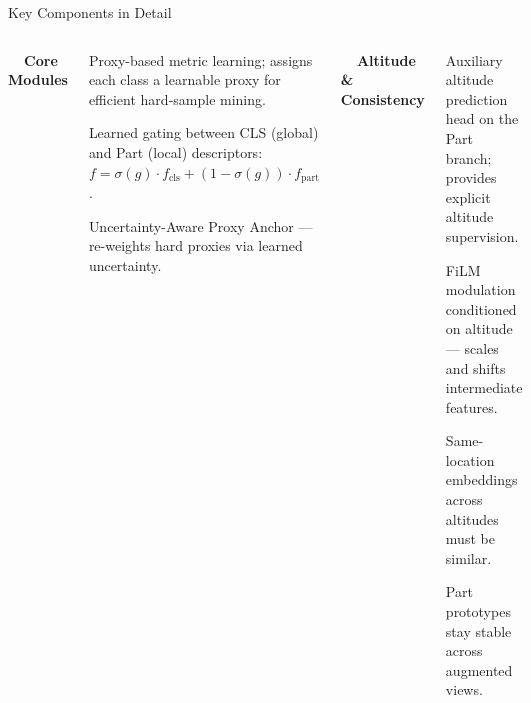 \documentclass[aspectratio=169, 11pt]{beamer}
\begin{document}
\begin{frame}{Key Components in Detail}
\begin{columns}[T]
\vspace{0.1cm}
{\large \textbf{\faCogs\ \ Core Modules}}
\vspace{0.2cm}
\footnotesize
\begin{description}
  \setlength\itemsep{0.5em}
  \item[\textcolor{dangerred}{ProxyAnchor}] Proxy-based metric learning; assigns each class a learnable proxy for efficient hard-sample mining.
  \item[\textcolor{warnorange}{FusionGate}] Learned gating between CLS (global) and Part (local) descriptors:
    $f = \sigma(g) \cdot f_{\text{cls}} + (1{-}\sigma(g)) \cdot f_{\text{part}}$.
  \item[\textcolor{navyblue}{UAPA}] Uncertainty-Aware Proxy Anchor --- re-weights hard proxies via learned uncertainty.
\end{description}

\vspace{0.1cm}
{\large \textbf{\faChartArea\ \ Altitude \& Consistency}}
\vspace{0.2cm}
\footnotesize
\begin{description}
  \setlength\itemsep{0.5em}
  \item[\textcolor{steelblue}{AltPred}] Auxiliary altitude prediction head on the Part branch; provides explicit altitude supervision.
  \item[\textcolor{lightslate}{DeepAltFiLM}] FiLM modulation conditioned on altitude --- scales and shifts intermediate features.
  \item[\textcolor{successgreen!80!black}{AltConsist}] Same-location embeddings across altitudes must be similar.
  \item[\textcolor{successgreen!80!black}{PartConsist}] Part prototypes stay stable across augmented views.
\end{description}
\end{columns}
\end{frame}
\end{document}
